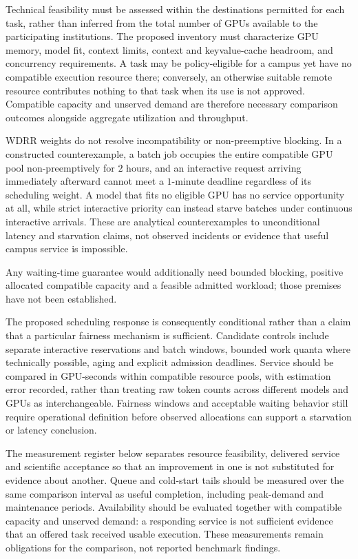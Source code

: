 \documentclass[11pt]{article}
\begin{document}
Technical feasibility must be assessed within the destinations permitted for each task, rather than inferred from the total number of GPUs available to the participating institutions. The proposed inventory must characterize GPU memory, model fit, context limits, context and key\textendash{}\allowbreak{}value-cache headroom, and concurrency requirements. A task may be policy-eligible for a campus yet have no compatible execution resource there; conversely, an otherwise suitable remote resource contributes nothing to that task when its use is not approved. Compatible capacity and unserved demand are therefore necessary comparison outcomes alongside aggregate utilization and throughput.

WDRR weights do not resolve incompatibility or non-preemptive blocking. In a constructed counterexample, a batch job occupies the entire compatible GPU pool non-preemptively for $2$ hours, and an interactive request arriving immediately afterward cannot meet a $1$-minute deadline regardless of its scheduling weight. A model that fits no eligible GPU has no service opportunity at all, while strict interactive priority can instead starve batches under continuous interactive arrivals. These are analytical counterexamples to unconditional latency and starvation claims, not observed incidents or evidence that useful campus service is impossible.

Any waiting-time guarantee would additionally need bounded blocking, positive allocated compatible capacity and a feasible admitted workload; those premises have not been established.

The proposed scheduling response is consequently conditional rather than a claim that a particular fairness mechanism is sufficient. Candidate controls include separate interactive reservations and batch windows, bounded work quanta where technically possible, aging and explicit admission deadlines. Service should be compared in GPU-seconds within compatible resource pools, with estimation error recorded, rather than treating raw token counts across different models and GPUs as interchangeable. Fairness windows and acceptable waiting behavior still require operational definition before observed allocations can support a starvation or latency conclusion.

The measurement register below separates resource feasibility, delivered service and scientific acceptance so that an improvement in one is not substituted for evidence about another. Queue and cold-start tails should be measured over the same comparison interval as useful completion, including peak-demand and maintenance periods. Availability should be evaluated together with compatible capacity and unserved demand: a responding service is not sufficient evidence that an offered task received usable execution. These measurements remain obligations for the comparison, not reported benchmark findings.
\end{document}
